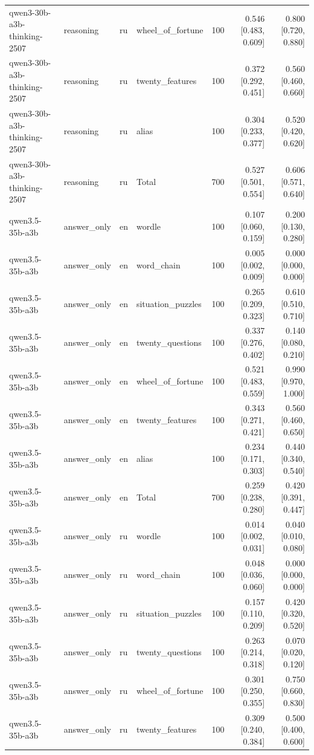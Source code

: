 \begin{longtable}{llllrrr}
qwen3-30b-a3b-thinking-2507 & reasoning & ru & wheel\_of\_fortune & 100 & 0.546 [0.483, 0.609] & 0.800 [0.720, 0.880] \\
qwen3-30b-a3b-thinking-2507 & reasoning & ru & twenty\_features & 100 & 0.372 [0.292, 0.451] & 0.560 [0.460, 0.660] \\
qwen3-30b-a3b-thinking-2507 & reasoning & ru & alias & 100 & 0.304 [0.233, 0.377] & 0.520 [0.420, 0.620] \\
qwen3-30b-a3b-thinking-2507 & reasoning & ru & Total & 700 & 0.527 [0.501, 0.554] & 0.606 [0.571, 0.640] \\
qwen3.5-35b-a3b & answer\_only & en & wordle & 100 & 0.107 [0.060, 0.159] & 0.200 [0.130, 0.280] \\
qwen3.5-35b-a3b & answer\_only & en & word\_chain & 100 & 0.005 [0.002, 0.009] & 0.000 [0.000, 0.000] \\
qwen3.5-35b-a3b & answer\_only & en & situation\_puzzles & 100 & 0.265 [0.209, 0.323] & 0.610 [0.510, 0.710] \\
qwen3.5-35b-a3b & answer\_only & en & twenty\_questions & 100 & 0.337 [0.276, 0.402] & 0.140 [0.080, 0.210] \\
qwen3.5-35b-a3b & answer\_only & en & wheel\_of\_fortune & 100 & 0.521 [0.483, 0.559] & 0.990 [0.970, 1.000] \\
qwen3.5-35b-a3b & answer\_only & en & twenty\_features & 100 & 0.343 [0.271, 0.421] & 0.560 [0.460, 0.650] \\
qwen3.5-35b-a3b & answer\_only & en & alias & 100 & 0.234 [0.171, 0.303] & 0.440 [0.340, 0.540] \\
qwen3.5-35b-a3b & answer\_only & en & Total & 700 & 0.259 [0.238, 0.280] & 0.420 [0.391, 0.447] \\
qwen3.5-35b-a3b & answer\_only & ru & wordle & 100 & 0.014 [0.002, 0.031] & 0.040 [0.010, 0.080] \\
qwen3.5-35b-a3b & answer\_only & ru & word\_chain & 100 & 0.048 [0.036, 0.060] & 0.000 [0.000, 0.000] \\
qwen3.5-35b-a3b & answer\_only & ru & situation\_puzzles & 100 & 0.157 [0.110, 0.209] & 0.420 [0.320, 0.520] \\
qwen3.5-35b-a3b & answer\_only & ru & twenty\_questions & 100 & 0.263 [0.214, 0.318] & 0.070 [0.020, 0.120] \\
qwen3.5-35b-a3b & answer\_only & ru & wheel\_of\_fortune & 100 & 0.301 [0.250, 0.355] & 0.750 [0.660, 0.830] \\
qwen3.5-35b-a3b & answer\_only & ru & twenty\_features & 100 & 0.309 [0.240, 0.384] & 0.500 [0.400, 0.600] \\

\end{longtable}
